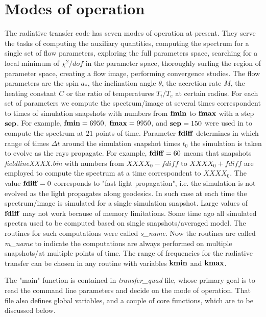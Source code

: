 \documentclass{emulateapj}
\begin{document}
\section{Modes of operation}
The radiative transfer code has seven modes of operation at present. They serve the tasks of computing the auxiliary quantities,
computing the spectrum for a single set of flow parameters, exploring the full parameters space, searching for a local minimum of $\chi^2/dof$ in the parameter space,
thoroughly surfing the region of parameter space, creating a flow image, performing convergence studies.
The flow parameters are the spin $a_*$, the inclination angle $\theta$, the accretion rate $\dot{M}$, the heating constant $C$ or the ratio of temperatures $T_i/T_e$ at certain radius.
For each set of parameters we compute the spectrum/image at several times correspondent to times of simulation snapshots with numbers from ${\bf fmin}$ to ${\bf fmax}$ with a step ${\bf sep}$.
For example, ${\bf fmin}=6950$, ${\bf fmax}=9950$, and ${\bf sep}=150$ were used in \citet{Shcherbakov:2012appl} to compute the spectrum at $21$ points of time.
Parameter ${\bf fdiff}$ determines in which range of times $\Delta t$ around the simulation snapshot times $t_0$ the simulation is taken to evolve as the rays propagate.
For example, ${\bf fdiff}=60$ means that snapshots \textit{fieldlineXXXX.bin} with numbers from $XXXX_0-fdiff$ to $XXXX_0+fdiff$ are employed to compute the spectrum at
a time correspondent to $XXXX_0$. The value ${\bf fdiff}=0$ corresponds to "fast light propagation", i.e. the simulation is not evolved as the light propagates along geodesics.
In such case at each time the spectrum/image is simulated for a single simulation snapshot. Large values of ${\bf fdiff}$ may not work because of memory limitations.
Some time ago all simulated spectra used to be computed based on single snapshots/averaged model.
The routines for such computations were called \textit{s\_name}. Now the routines are called \textit{m\_name} to indicate
the computations are always performed on multiple snapshots/at multiple points of time.
The range of frequencies for the radiative transfer can be chosen in any routine with variables ${\bf kmin}$ and ${\bf kmax}$.

The "main" function is contained in \textit{transfer\_quad} file, whose primary goal is to read the
command line parameters and decide on the mode of operation. That file also defines global variables,
and a couple of core functions, which are to be discussed below.
\end{document}
